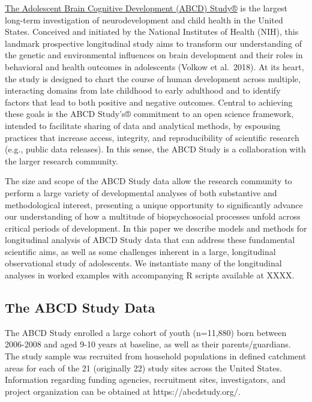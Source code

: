 \documentclass[
  number,
  preprint,
  3p,
  twocolumn]{elsarticle}
\begin{document}
\label{sec:headings}
\protect\hypertarget{abcdwebsite}{\href{https://abcdstudy.org/}{The
Adolescent Brain Cognitive Development (ABCD) Study®}} is the largest
long-term investigation of neurodevelopment and child health in the
United States. Conceived and initiated by the National Institutes of
Health (NIH), this landmark prospective longitudinal study aims to
transform our understanding of the genetic and environmental influences
on brain development and their roles in behavioral and health outcomes
in adolescents (Volkow et al.~2018). At its heart, the study is designed
to chart the course of human development across multiple, interacting
domains from late childhood to early adulthood and to identify factors
that lead to both positive and negative outcomes. Central to achieving
these goals is the ABCD Study's® commitment to an open science
framework, intended to facilitate sharing of data and analytical
methods, by espousing practices that increase access, integrity, and
reproducibility of scientific research (e.g., public data releases). In
this sense, the ABCD Study is a collaboration with the larger research
community.

The size and scope of the ABCD Study data allow the research community
to perform a large variety of developmental analyses of both substantive
and methodological interest, presenting a unique opportunity to
significantly advance our understanding of how a multitude of
biopsychosocial processes unfold across critical periods of development.
In this paper we describe models and methods for longitudinal analysis
of ABCD Study data that can address these fundamental scientific aims,
as well as some challenges inherent in a large, longitudinal
observational study of adolescents. We instantiate many of the
longitudinal analyses in worked examples with accompanying R scripts
available at XXXX.

\hypertarget{the-abcd-study-data}{%
\subsection{The ABCD Study Data}\label{the-abcd-study-data}}

The ABCD Study enrolled a large cohort of youth (n=11,880) born between
2006-2008 and aged 9-10 years at baseline, as well as their
parents/guardians. The study sample was recruited from household
populations in defined catchment areas for each of the 21 (originally
22) study sites across the United States. Information regarding funding
agencies, recruitment sites, investigators, and project organization can
be obtained at https://abcdstudy.org/.
\end{document}

